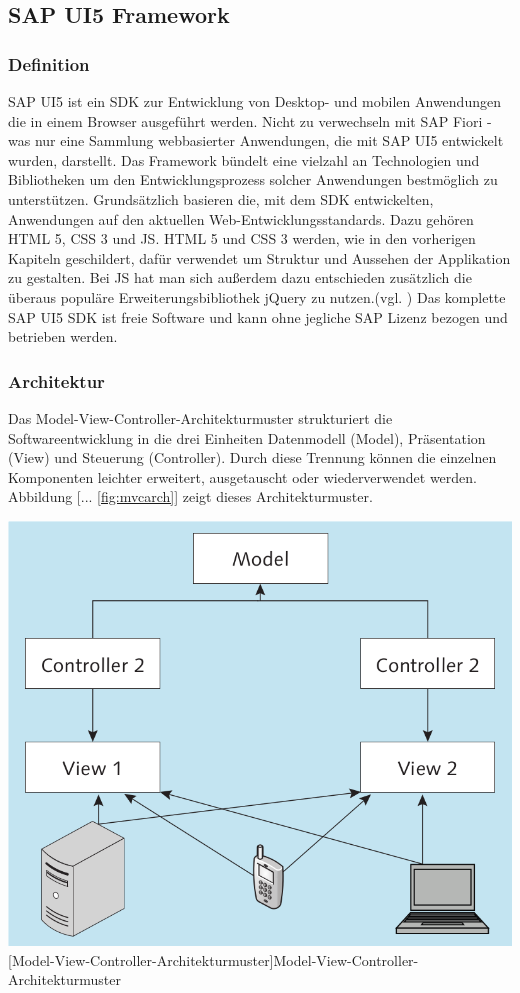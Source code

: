 \documentclass[12pt,a4paper,bibliography=totocnumbered,listof=totocnumbered]{scrartcl}
\begin{document}
\subsection{SAP UI5 Framework}
\subsubsection{Definition}
SAP UI5 ist ein \ac{SDK} zur Entwicklung von Desktop- und mobilen Anwendungen die in einem Browser ausgeführt werden. Nicht zu verwechseln mit SAP Fiori - was nur eine Sammlung webbasierter Anwendungen, die mit SAP UI5 entwickelt wurden, darstellt. Das Framework bündelt eine vielzahl an Technologien und Bibliotheken um den Entwicklungsprozess solcher Anwendungen bestmöglich zu unterstützen. Grundsätzlich basieren die, mit dem SDK entwickelten, Anwendungen auf den aktuellen Web-Entwicklungsstandards. Dazu gehören HTML 5, CSS 3 und JS. HTML 5 und CSS 3 werden, wie in den vorherigen Kapiteln geschildert, dafür verwendet um Struktur und Aussehen der Applikation zu gestalten. Bei JS hat man sich außerdem dazu entschieden zusätzlich die überaus populäre Erweiterungsbibliothek jQuery zu nutzen.(vgl. \cite{BuiltWith2014}) Das komplette SAP UI5 SDK ist freie Software und kann ohne jegliche SAP Lizenz bezogen und betrieben werden.

\subsubsection{Architektur}
\glqq Das Model-View-Controller-Architekturmuster strukturiert die Softwareentwicklung in die drei Einheiten Datenmodell (Model), Präsentation (View) und Steuerung (Controller). Durch diese Trennung können die einzelnen Komponenten leichter erweitert, ausgetauscht oder wiederverwendet werden. Abbildung [... \ref{fig:mvcarch}] zeigt dieses Architekturmuster.

	\vspace{1em}
	\begin{minipage}{\linewidth}
		\centering
		\includegraphics[width=0.7\linewidth]{images/mvc_arch.png}
		[Model-View-Controller-Architekturmuster]{Model-View-Controller-Architekturmuster\cite[S.123]{AntoEinf2014}}
		\label{fig:mvcarch}
	\end{minipage}
\end{document}

